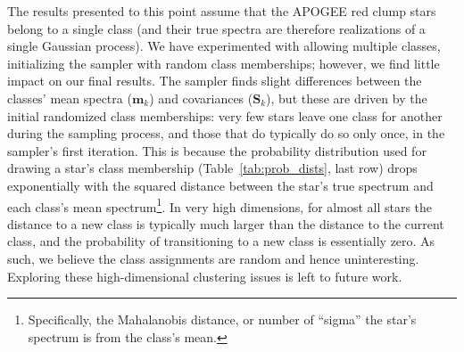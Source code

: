 \documentclass[a4paper,fleqn,usenatbib]{mnras}
\newcommand{\specmean}{{\bm m}}
\newcommand{\speccov}{{\bm S}}
\begin{document}
The results presented to this point assume that the APOGEE red clump stars belong to a single class (and their true spectra are therefore realizations of a single Gaussian process). We have experimented with allowing multiple classes, initializing the sampler with random class memberships; however, we find little impact on our final results. The sampler finds slight differences between the classes' mean spectra ($\specmean_k$) and covariances ($\speccov_k$), but these are driven by the initial randomized class memberships: very few stars leave one class for another during the sampling process, and those that do typically do so only once, in the sampler's first iteration. This is because the probability distribution used for drawing a star's class membership (Table~\ref{tab:prob_dists}, last row) drops exponentially with the squared distance between the star's true spectrum and each class's mean spectrum\footnote{Specifically, the Mahalanobis distance, or number of ``sigma'' the star's spectrum is from the class's mean.}. In very high dimensions, for almost all stars the distance to a new class is typically much larger than the distance to the current class, and the probability of transitioning to a new class is essentially zero. As such, we believe the class assignments are random and hence uninteresting. Exploring these high-dimensional clustering issues is left to future work. 
\end{document}
